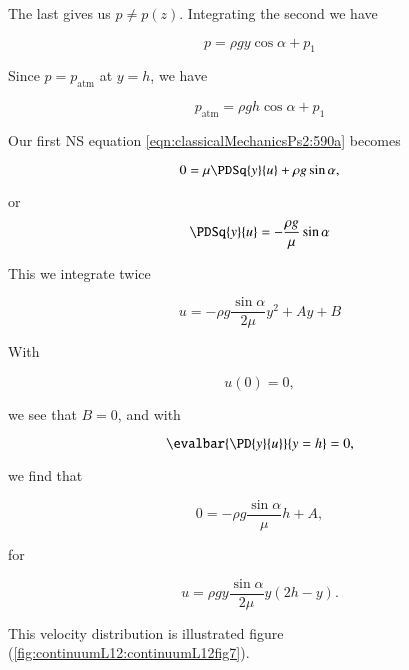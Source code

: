 The last gives us $p \ne p(z)$.  Integrating the second we have

\begin{equation}\label{eqn:continuumL12:410}
p = \rho g y \cos\alpha + p_1
\end{equation}

Since $p = p_{\text{atm}}$ at $y = h$, we have

\begin{equation}\label{eqn:continuumL12:430}
p_{\text{atm}} = \rho g h \cos\alpha + p_1
\end{equation}

Our first NS equation \ref{eqn:classicalMechanicsPs2:590a} becomes

\begin{equation}\label{eqn:continuumL12:450}
0 = \mu \PDSq{y}{u} + \rho g \sin\alpha,
\end{equation}

or
\begin{equation}\label{eqn:continuumL12:470}
\PDSq{y}{u} = -\frac{\rho g}{\mu} \sin\alpha
\end{equation}

This we integrate twice

\begin{equation}\label{eqn:continuumL12:490}
u = - \rho g \frac{\sin\alpha}{2 \mu} y^2 + A y + B
\end{equation}

With

\begin{equation}\label{eqn:continuumL12:510a}
u(0) = 0,
\end{equation}

we see that $B = 0$, and with

\begin{equation}\label{eqn:continuumL12:510b}
\evalbar{\PD{y}{u}}{y = h} = 0,
\end{equation}

we find that

\begin{equation}\label{eqn:continuumL12:510c}
0 = - \rho g \frac{\sin\alpha}{\mu} h + A,
\end{equation}

for

\begin{equation}\label{eqn:classicalMechanicsPs2:530}
u = \rho g y \frac{\sin\alpha}{2 \mu} y \left( 2 h - y \right).
\end{equation}

This velocity distribution is illustrated figure (\ref{fig:continuumL12:continuumL12fig7}).

